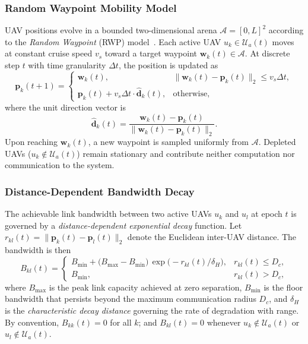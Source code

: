 \subsubsection*{Random Waypoint Mobility Model}

UAV positions evolve in a bounded two-dimensional arena
$\mathcal{A} = [0, L]^2$ according to the \emph{Random Waypoint}
(RWP) model~\cite{rwp_model}.
Each active UAV $u_k \in \mathcal{U}_a(t)$ moves at constant cruise
speed $v_s$ toward a target waypoint $\mathbf{w}_k(t) \in \mathcal{A}$.
At discrete step $t$ with time granularity $\Delta t$, the position
is updated as
\begin{equation}
  \mathbf{p}_k(t+1) =
  \begin{cases}
    \mathbf{w}_k(t),
      & \|\mathbf{w}_k(t) - \mathbf{p}_k(t)\|_2 \leq v_s \Delta t, \\[5pt]
    \mathbf{p}_k(t)
      + v_s \Delta t \cdot \hat{\mathbf{d}}_k(t),
      & \text{otherwise,}
  \end{cases}
  \label{eq:rwp}
\end{equation}
where the unit direction vector is
\begin{equation*}
  \hat{\mathbf{d}}_k(t) =
  \frac{\mathbf{w}_k(t) - \mathbf{p}_k(t)}
       {\|\mathbf{w}_k(t) - \mathbf{p}_k(t)\|_2}.
\end{equation*}
Upon reaching $\mathbf{w}_k(t)$, a new waypoint is sampled uniformly
from $\mathcal{A}$.
Depleted UAVs ($u_k \notin \mathcal{U}_a(t)$) remain stationary and
contribute neither computation nor communication to the system.

\subsubsection*{Distance-Dependent Bandwidth Decay}

The achievable link bandwidth between two active UAVs $u_k$ and $u_l$
at epoch $t$ is governed by a \emph{distance-dependent exponential
decay} function.
Let $r_{kl}(t) = \|\mathbf{p}_k(t) - \mathbf{p}_l(t)\|_2$ denote
the Euclidean inter-UAV distance.
The bandwidth is then
\begin{equation}
  B_{kl}(t) =
  \begin{cases}
    B_{\min} + \bigl(B_{\max} - B_{\min}\bigr)\,
      \exp\!\bigl(-r_{kl}(t)/\delta_H\bigr),
    & r_{kl}(t) \leq D_c, \\[4pt]
    B_{\min},
    & r_{kl}(t) > D_c,
  \end{cases}
  \label{eq:bandwidth}
\end{equation}
where $B_{\max}$ is the peak link capacity achieved at zero
separation, $B_{\min}$ is the floor bandwidth that persists beyond
the maximum communication radius $D_c$, and $\delta_H$ is the
\emph{characteristic decay distance} governing the rate of
degradation with range.
By convention, $B_{kk}(t) = 0$ for all $k$; and $B_{kl}(t) = 0$
whenever $u_k \notin \mathcal{U}_a(t)$ or $u_l \notin
\mathcal{U}_a(t)$.

